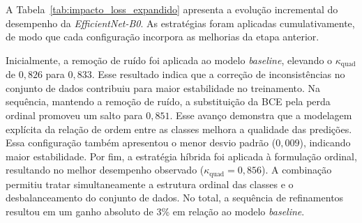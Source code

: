 A Tabela~\ref{tab:impacto_loss_expandido} apresenta a evolução incremental do desempenho da \textit{EfficientNet-B0}. As estratégias foram aplicadas cumulativamente, de modo que cada configuração incorpora as melhorias da etapa anterior.

Inicialmente, a remoção de ruído foi aplicada ao modelo \textit{baseline}, elevando o $\kappa_{\text{quad}}$ de $0{,}826$ para $0{,}833$. Esse resultado indica que a correção de inconsistências no conjunto de dados contribuiu para maior estabilidade no treinamento. Na sequência, mantendo a remoção de ruído, a substituição da BCE pela perda ordinal promoveu um salto para $0{,}851$. Esse avanço demonstra que a modelagem explícita da relação de ordem entre as classes melhora a qualidade das predições. Essa configuração também apresentou o menor desvio padrão ($0{,}009$), indicando maior estabilidade. Por fim, a estratégia híbrida foi aplicada à formulação ordinal, resultando no melhor desempenho observado ($\kappa_{\text{quad}} = 0{,}856$). A combinação permitiu tratar simultaneamente a estrutura ordinal das classes e o desbalanceamento do conjunto de dados. No total, a sequência de refinamentos resultou em um ganho absoluto de 3\% em relação ao modelo \textit{baseline}.

\begin{table}[!htb]
	\centering
	\caption{Impacto da formulação da função de perda no desempenho da EfficientNet-B0}
	\label{tab:impacto_loss_expandido}
\end{table}

